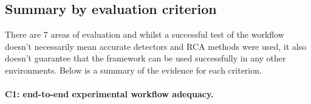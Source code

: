 





\subsection{Summary by evaluation criterion}

There are 7 areas of evaluation and whilst a successful test of the workflow doesn’t necessarily mean accurate detectors and RCA methods were used, it also doesn’t guarantee that the framework can be used successfully in any other environments. Below is a summary of the evidence for each criterion.

\paragraph{C1: end-to-end experimental workflow adequacy.}

